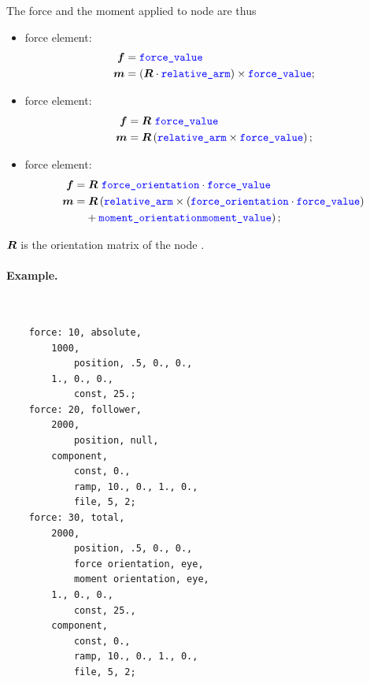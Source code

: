 The force and the moment applied to node  are thus
\begin{itemize}
\item {} force element:
\begin{subequations}
\begin{align}
	\boldsymbol{f} & = \textcolor{blue}{\texttt{force\_value}} \\
	\boldsymbol{m} & = \left( \boldsymbol{R} \cdot \textcolor{blue}{\texttt{relative\_arm}} \right) \times \textcolor{blue}{\texttt{force\_value}} ;
\end{align}
\end{subequations}

\item {} force element:
\begin{subequations}
\begin{align}
	\boldsymbol{f} & = \boldsymbol{R} \ \textcolor{blue}{\texttt{force\_value}} \\
	\boldsymbol{m} & = \boldsymbol{R} \left( \textcolor{blue}{\texttt{relative\_arm}} \times \textcolor{blue}{\texttt{force\_value}} \right) ;
\end{align}
\end{subequations}

\item {} force element:
\begin{subequations}
\begin{align}
	\boldsymbol{f} & = \boldsymbol{R} \ \textcolor{blue}{\texttt{force\_orientation}} \cdot \textcolor{blue}{\texttt{force\_value}} \\
	\boldsymbol{m} & = \boldsymbol{R} \left( 
		\textcolor{blue}{\texttt{relative\_arm}} \times \left(  \textcolor{blue}{\texttt{force\_orientation}} \cdot \textcolor{blue}{\texttt{force\_value}} \right)
	 \right. \nonumber \\
	& \left. \hphantom{= } \mbox{} +
		\textcolor{blue}{\texttt{moment\_orientation}} \textcolor{blue}{\texttt{moment\_value}}
	 \right);
\end{align}
\end{subequations}

\end{itemize}
$\boldsymbol{R}$ is the orientation matrix of the node .

\paragraph{Example.} \
\begin{verbatim}
    force: 10, absolute,
        1000,
            position, .5, 0., 0.,
        1., 0., 0.,
            const, 25.;
    force: 20, follower,
        2000,
            position, null,
        component,
            const, 0.,
            ramp, 10., 0., 1., 0.,
            file, 5, 2;
    force: 30, total,
        2000,
            position, .5, 0., 0.,
            force orientation, eye,
            moment orientation, eye,
        1., 0., 0.,
            const, 25.,
        component,
            const, 0.,
            ramp, 10., 0., 1., 0.,
            file, 5, 2;
\end{verbatim}
